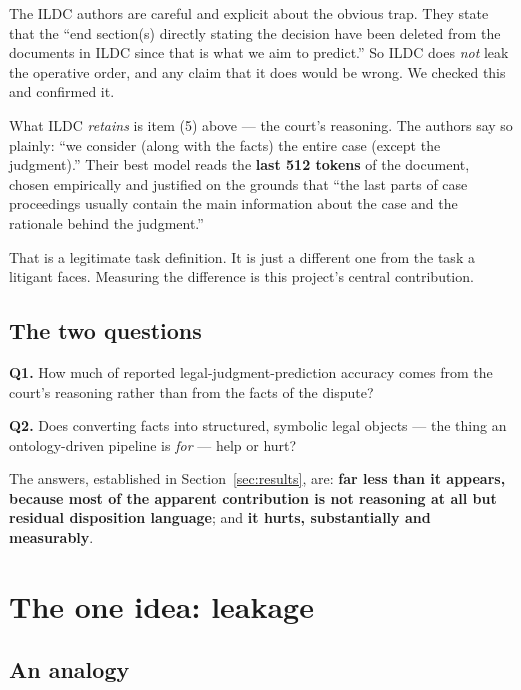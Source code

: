 \documentclass[12pt,a4paper]{article}
\begin{document}
The ILDC authors are careful and explicit about the obvious trap. They state that the ``end
section(s) directly stating the decision have been deleted from the documents in ILDC since that is
what we aim to predict.'' So ILDC does \emph{not} leak the operative order, and any claim that it
does would be wrong. We checked this and confirmed it.

What ILDC \emph{retains} is item (5) above --- the court's reasoning. The authors say so plainly:
``we consider (along with the facts) the entire case (except the judgment).'' Their best model reads
the \textbf{last 512 tokens} of the document, chosen empirically and justified on the grounds that
``the last parts of case proceedings usually contain the main information about the case and the
rationale behind the judgment.''

That is a legitimate task definition. It is just a different one from the task a litigant faces.
Measuring the difference is this project's central contribution.

\subsection{The two questions}

\begin{tcolorbox}[plainbox,title={The questions this project actually answers}]
\textbf{Q1.} How much of reported legal-judgment-prediction accuracy comes from the court's
reasoning rather than from the facts of the dispute?

\smallskip
\textbf{Q2.} Does converting facts into structured, symbolic legal objects --- the thing an
ontology-driven pipeline is \emph{for} --- help or hurt?
\end{tcolorbox}

The answers, established in Section~\ref{sec:results}, are: \textbf{far less than it appears,
because most of the apparent contribution is not reasoning at all but residual disposition
language}; and \textbf{it hurts, substantially and measurably}.

\section{The one idea: leakage}\label{sec:leakage}

\subsection{An analogy}
\end{document}
